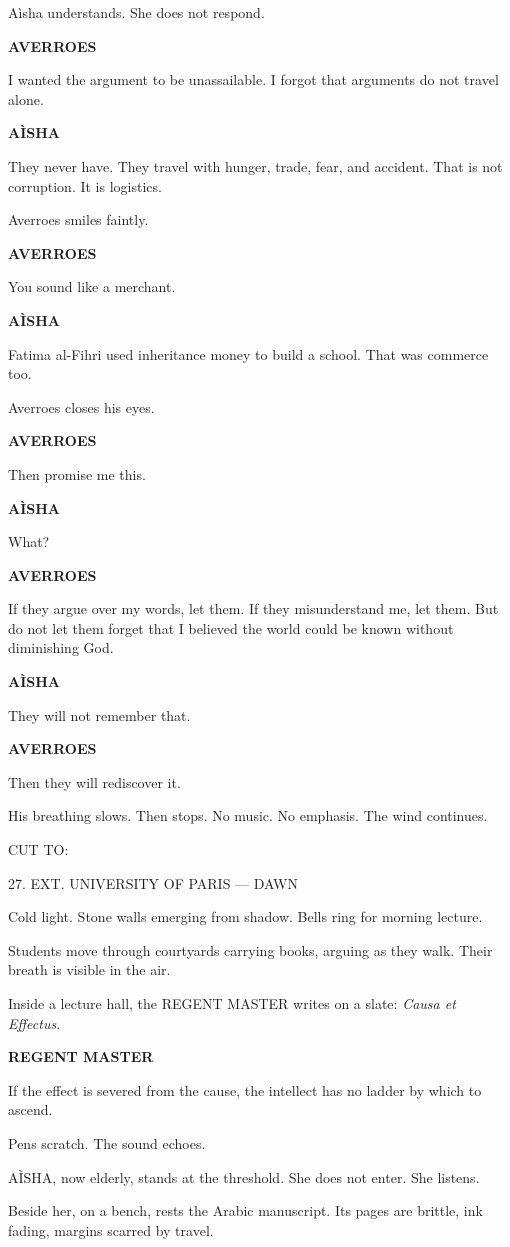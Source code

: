 \documentclass[12pt]{article}
\newlength{\charindent}
\newlength{\dialogueindent}
\newlength{\dialoguewidth}
\newlength{\transitionindent}
\newcommand{\slug}[1]{\vspace{1.25em}\textsc{#1}\vspace{0.5em}}
\newcommand{\action}[1]{#1}
\newcommand{\character}[1]{%
  \par\vspace{0.75em}%
  \hspace*{\charindent}\textbf{#1}%
}
\newcommand{\dialogue}[1]{%
  \par\nobreak
  \hspace*{\dialogueindent}%
  \begin{minipage}[t]{\dialoguewidth}
  #1
  \end{minipage}
}
\newcommand{\transition}[1]{%
  \par\vspace{1em}%
  \hspace*{\transitionindent}\textsc{#1}%
}
\begin{document}
\action{A\`isha understands. She does not respond.}

\character{AVERROES}
\dialogue{I wanted the argument to be unassailable. I forgot that arguments do not travel alone.}

\character{A\`ISHA}
\dialogue{They never have. They travel with hunger, trade, fear, and accident. That is not corruption. It is logistics.}

\action{Averroes smiles faintly.}

\character{AVERROES}
\dialogue{You sound like a merchant.}

\character{A\`ISHA}
\dialogue{Fatima al-Fihri used inheritance money to build a school. That was commerce too.}

\action{Averroes closes his eyes.}

\character{AVERROES}
\dialogue{Then promise me this.}

\character{A\`ISHA}
\dialogue{What?}

\character{AVERROES}
\dialogue{If they argue over my words, let them. If they misunderstand me, let them. But do not let them forget that I believed the world could be known without diminishing God.}

\character{A\`ISHA}
\dialogue{They will not remember that.}

\character{AVERROES}
\dialogue{Then they will rediscover it.}

\action{His breathing slows. Then stops. No music. No emphasis. The wind continues.}

\transition{CUT TO:}

\slug{27. EXT. UNIVERSITY OF PARIS --- DAWN}

\action{Cold light. Stone walls emerging from shadow. Bells ring for morning lecture.}

\action{Students move through courtyards carrying books, arguing as they walk. Their breath is visible in the air.}

\action{Inside a lecture hall, the REGENT MASTER writes on a slate: \emph{Causa et Effectus}.}

\character{REGENT MASTER}
\dialogue{If the effect is severed from the cause, the intellect has no ladder by which to ascend.}

\action{Pens scratch. The sound echoes.}

\action{A\`ISHA, now elderly, stands at the threshold. She does not enter. She listens.}

\action{Beside her, on a bench, rests the Arabic manuscript. Its pages are brittle, ink fading, margins scarred by travel.}
\end{document}
